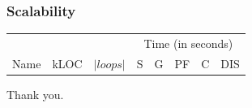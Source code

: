 \documentclass{beamer}
\begin{document}
\begin{frame}
	\frametitle{Scalability}

\begin{table}[!h]
	\centering
\begin{tabular}{|l|r|r||r|r|r|r|r|} \hline
	 	 & & &
        \multicolumn{5}{|c|}{Time (in seconds)} 
		\\ \cline{4-8}
		Name & kLOC & $ |loops| $ & S & G & PF & C & DIS \\ \hline
		
	\hline
\end{tabular}
\label{fig:projects}
\end{table}

\end{frame}

\begin{frame}
	\begin{center}
		Thank you.
	\end{center}
\end{frame}
\end{document}

